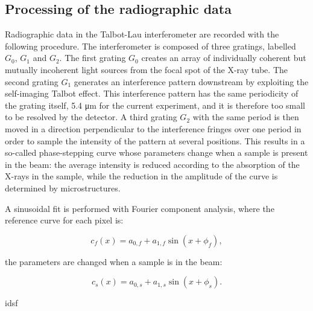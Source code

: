 \subsection{Processing of the radiographic data}\label{sec:radioprocessing}
Radiographic data in the Talbot-Lau interferometer are recorded with the
following procedure. The interferometer is composed of three gratings,
labelled $G_0$, $G_1$ and $G_2$. The first grating $G_0$ creates an array of
individually coherent but mutually incoherent light sources from the
focal spot of the X-ray tube. The second grating $G_1$ generates an
interference pattern downstream by exploiting the self-imaging Talbot
effect. This interference pattern has the same periodicity of the grating
itself, 5.4 μm for the current experiment, and it is therefore too small to
be resolved by the detector. A third grating $G_2$ with the same period is
then moved in a direction perpendicular to the interference fringes over one
period in order to sample the intensity of the pattern at several positions.
This results in a so-called phase-stepping curve whose parameters change
when a sample is present in the beam: the average intensity is reduced
according to the absorption of the X-rays in the sample, while the reduction
in the amplitude of the curve is determined by microstructures.

A sinusoidal fit is performed with Fourier component analysis, where the
reference curve for each pixel is:

\begin{equation}
    c_f(x) = a_{0,f} + a_{1,f} \sin(x + \phi_{f}),
    \label{eqn:flat}
\end{equation}

the parameters are changed when a sample is in the beam:

\begin{equation}
    c_s(x) = a_{0,s} + a_{1,s} \sin(x + \phi_{s}).
    \label{eqn:sample}
\end{equation}

idsf

